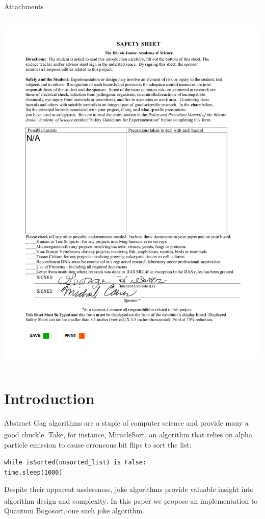 \documentclass{beamer}
\begin{document}
\begin{frame}{Attachments}
\begin{columns}
            \includegraphics[width=\linewidth]{images/safety_sheet.png}
    \end{columns}
  \end{frame}
  
  \section{Introduction}
  
  \begin{frame}{Abstract}
    Gag algorithms are a staple of computer science and provide many a good chuckle. Take, for instance, MiracleSort\textsuperscript{\color{blue}\cite{thompson_2013}}, an algorithm that relies on alpha particle emission to cause erroneous bit flips to sort the list:
    \begin{center} \texttt{while isSorted(unsorted\_list) is False: \\ \hspace{-70} time.sleep(1000)} \end{center}
    Despite their apparent uselessness, joke algorithms provide valuable insight into algorithm design and complexity\textsuperscript{\color{blue}\cite{gruber_holzer_ruepp_2007}}. In this paper we propose an implementation to Quantum Bogosort, one such joke algorithm.
  \end{frame}
  
\end{document}
